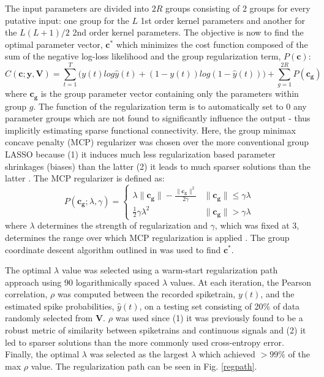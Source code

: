 \documentclass[11pt,a4paper,final]{article}
\begin{document}
The input parameters are divided into $2R$ groups consisting of 2 groups for every putative input: one group for the $L$ 1st order kernel parameters and another for the $L(L+1)/2$ 2nd order kernel parameters.
The objective is now to find the optimal parameter vector, $\bm{c}^*$ which minimizes the cost function composed of the sum of the negative log-loss likelihood and the group regularization term, $P(\bm{c})$:
\begin{equation}
C(\bm{c};\bm{y},\bm{V})=\sum_{t=1}^T\Big(y(t)log\hat{y}(t)+(1-y(t))log(1-\hat{y}(t))\Big)+\sum_{g=1}^{2R}P(\bm{c_g})
\label{eq:cost}
\end{equation}
where $\bm{c_g}$ is the group parameter vector containing only the parameters within group $g$.
The function of the regularization term is to automatically set to 0 any parameter groups which are not found to significantly influence the output - thus implicitly estimating sparse functional connectivity.
Here, the group minimax concave penalty (MCP) regularizer was chosen over the more conventional group LASSO because (1) it induces much less regularization based parameter shrinkages (biases) than the latter (2) it leads to much sparser solutions than the latter \citep{breheny15,zhang10}.
The MCP regularizer is defined as:
\begin{equation}
P(\bm{c_g};\lambda,\gamma) =
\begin{cases}
\lambda\|\bm{c_g}\|-\frac{\|\bm{c_g}\|^2}{2\gamma}  & \|\bm{c_g}\| \leq \gamma\lambda \\
\frac{1}{2}\gamma\lambda^2                          & \|\bm{c_g}\| >    \gamma\lambda
\end{cases}
\end{equation}
where $\lambda$ determines the strength of regularization and $\gamma$, which was fixed at 3, determines the range over which MCP regularization is applied \citep{breheny15}.
The group coordinate descent algorithm outlined in \citet{breheny15} was used to find $\bm{c}^*$.

The optimal $\lambda$ value was selected using a warm-start regularization path approach using 90 logarithmically spaced $\lambda$ values.
At each iteration, the Pearson correlation, $\rho$ was computed between the recorded spiketrain, $y(t)$, and the estimated spike probabilities, $\hat{y}(t)$, on a testing set consisting of 20\% of data randomly selected from $\bm{V}$.
$\rho$ was used since (1) it was previously found to be a robust metric of similarity between spiketrains and continuous signals \citep{sandler14} and (2) it led to sparser solutions than the more commonly used cross-entropy error.
Finally, the optimal $\lambda$ was selected as the largest $\lambda$ which achieved $>99\%$ of the max $\rho$ value.
The regularization path can be seen in Fig. \ref{regpath}.
\end{document}
